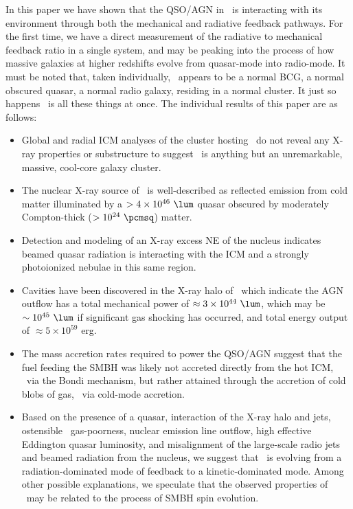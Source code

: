 \documentclass[useAMS,usenatbib]{mn2e}
\begin{document}
In this paper we have shown that the QSO/AGN in \inine\ is interacting
with its environment through both the mechanical and radiative
feedback pathways. For the first time, we have a direct measurement of
the radiative to mechanical feedback ratio in a single system, and may
be peaking into the process of how massive galaxies at higher
redshifts evolve from quasar-mode into radio-mode. It must be noted
that, taken individually, \irs\ appears to be a normal BCG, a normal
obscured quasar, a normal radio galaxy, residing in a normal
cluster. It just so happens \irs\ is all these things at once. The
individual results of this paper are as follows:
\begin{itemize}
\item Global and radial ICM analyses of the cluster hosting \irs\ do
  not reveal any X-ray properties or substructure to suggest \rxj\ is
  anything but an unremarkable, massive, cool-core galaxy cluster.
\item The nuclear X-ray source of \irs\ is well-described as reflected
  emission from cold matter illuminated by a $> 4 \times 10^{46}
  ~\lum$ quasar obscured by moderately Compton-thick ($> 10^{24}
  ~\pcmsq$) matter.
\item Detection and modeling of an X-ray excess NE of the nucleus
  indicates beamed quasar radiation is interacting with the ICM and a
  strongly photoionized nebulae in this same region.
\item Cavities have been discovered in the X-ray halo of \irs\ which
  indicate the AGN outflow has a total mechanical power of $\approx 3
  \times 10^{44} ~\lum$, which may be $\sim 10^{45} ~\lum$ if
  significant gas shocking has occurred, and total energy output of
  $\approx 5 \times 10^{59}$ erg.
\item The mass accretion rates required to power the QSO/AGN suggest
  that the fuel feeding the SMBH was likely not accreted directly from
  the hot ICM, \ie\ via the Bondi mechanism, but rather attained
  through the accretion of cold blobs of gas, \ie\ via cold-mode
  accretion.
\item Based on the presence of a quasar, interaction of the X-ray halo
  and jets, ostensible \irs\ gas-poorness, nuclear emission line
  outflow, high effective Eddington quasar luminosity, and
  misalignment of the large-scale radio jets and beamed radiation from
  the nucleus, we suggest that \irs\ is evolving from a
  radiation-dominated mode of feedback to a kinetic-dominated
  mode. Among other possible explanations, we speculate that the
  observed properties of \irs\ may be related to the process of SMBH
  spin evolution.
\end{itemize}
\end{document}
